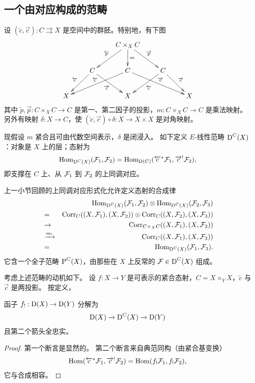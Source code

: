 \subsection{一个由对应构成的范畴}\label{SS: cat of corr}
设 $(\overleftarrow{c},\overrightarrow{c}): C\rightrightarrows X$ 是空间中的群胚。特别地，有下图
\begin{equation*}
\label{E: diagram}
\xymatrix{
&& C\times_XC\ar_{\overleftarrow{p}}[ld]\ar^{\overrightarrow{p}}[dr]\ar^m[d]& &\\
&C\ar_{\overleftarrow{c}}[ld]\ar_{\overrightarrow{c}}[rd]& C\ar_{\overleftarrow{c}}[lld]\ar^{\overrightarrow{c}}[rrd]&C\ar^{\overleftarrow{c}}[ld]\ar^{\overrightarrow{c}}[rd]&\\
X&&X&&X
}
\end{equation*}
其中 $\overleftarrow{p},\overrightarrow{p}: C\times_XC\to C$ 是第一、第二因子的投影，$m: C\times_XC\to C$ 是乘法映射。另外有映射 $\delta: X\to C$，使 $(\overleftarrow{c},\overrightarrow{c})\circ \delta:X\to X\times X$ 是对角映射。

现假设 $m$ 紧合且可由代数空间表示，$\delta$ 是闭浸入。
如下定义 $E$-线性范畴 $\operatorname{D}^C(X)$：对象是 $X$ 上的层；态射为
\begin{equation}
\label{E:HomDC}
{\operatorname{Hom}}_{\operatorname{D}^C(X)}({\mathcal F}_1,{\mathcal F}_2)={\operatorname{Hom}}_{\operatorname{D}(C)}(\overleftarrow{c}^*{\mathcal F}_1, \overrightarrow{c}^!{\mathcal F}_2),
\end{equation}
即支撑在 $C$ 上、从 ${\mathcal F}_1$ 到 ${\mathcal F}_2$ 的上同调对应。

上一小节回顾的上同调对应形式化允许定义态射的合成律
\begin{eqnarray*}
&&{\operatorname{Hom}}_{\operatorname{D}^C(X)}({\mathcal F}_1,{\mathcal F}_2)\otimes{\operatorname{Hom}}_{\operatorname{D}^C(X)}({\mathcal F}_2,{\mathcal F}_3)\\
&=&\operatorname{Corr}_C((X,{\mathcal F}_1),(X,{\mathcal F}_2))\otimes \operatorname{Corr}_C((X,{\mathcal F}_2),(X,{\mathcal F}_3))\\
&\to& \operatorname{Corr}_{C\times_XC}((X,{\mathcal F}_1),(X,{\mathcal F}_3)) \\
&\xrightarrow{m_!}& \operatorname{Corr}_C((X,{\mathcal F}_1),(X,{\mathcal F}_3))\\
&=&{\operatorname{Hom}}_{\operatorname{D}^C(X)}({\mathcal F}_1,{\mathcal F}_3).
\end{eqnarray*}
它含一个全子范畴 $\operatorname{P}^C(X)$，由那些在 $X$ 上反常的 ${\mathcal F}\in\operatorname{D}^C(X)$ 组成。

考虑上述范畴的动机如下。
设 $f:X\to Y$ 是可表示的紧合态射，$C=X\times_YX$，$\overleftarrow{c}$ 与 $\overrightarrow{c}$ 是两投影。
按定义，
\begin{lem}
\label{L: fully faithful}
函子 $f_!: \operatorname{D}(X)\to\operatorname{D}(Y)$ 分解为
\[\operatorname{D}(X)\to \operatorname{D}^C(X)\to \operatorname{D}(Y)\]
且第二个箭头全忠实。
\end{lem}
\begin{proof}
第一个断言是显然的。
第二个断言来自典范同构（由紧合基变换）
\[{\operatorname{Hom}}(\overleftarrow{c}^*{\mathcal F}_1,\overrightarrow{c}^!{\mathcal F}_2)={\operatorname{Hom}}(f_!{\mathcal F}_1,f_!{\mathcal F}_2),\]
它与合成相容。
\end{proof}


